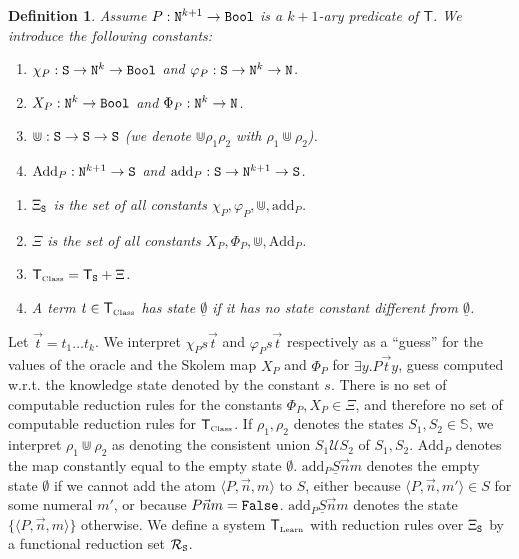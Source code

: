 \documentclass[copyright,creativecommons]{eptcs}
\newcommand{\Nat}                      { {\tt N} }
\newcommand{\Bool}                     { {\tt Bool} }
\newcommand{\State}                    { {\tt S} }
\newcommand{\StateSet}                 {\mathbb{S}}
\newcommand{\SystemT}                  {\mathsf{T}}
\newcommand{\False}                    { {\tt{False}} }
\newcommand{\Class}                    {\mbox{\tiny Class}}
\newcommand{\Learn}                    {\mbox{\tiny Learn}}
\newcommand{\SystemTClass}             {{\SystemT_{\Class}}}
\newcommand{\SystemTLearn}             {{\SystemT_{\Learn}}}
\newcommand{\CupSem}                   { {\mathcal U} }
\newcommand{\Add}                      { {\mbox{Add}} }
\newcommand{\add}                      { {\mbox{add}} }
\newcommand{\makestate}      [1]       { {\underline{#1}} }
\newtheorem{definition}{Definition}
\begin{document}
\begin{definition} \label{definition-TermLanguageL1}
Assume $P:\Nat^{k+1}\rightarrow \Bool$ is a $k+1$-ary predicate of $\SystemT$. We introduce the following constants:
\begin{enumerate}

\item
$\chi_P:\State \rightarrow \Nat^k\rightarrow \Bool$
and
$\varphi_P:\State \rightarrow \Nat^k\rightarrow \Nat$.

\item
$X_P:\Nat^k\rightarrow \Bool$ and $\Phi_P: \Nat^k \rightarrow \Nat$.

\item
$\Cup:\State\rightarrow \State \rightarrow \State$ (we denote $\Cup\rho_1\rho_2$ with $\rho_1\Cup\rho_2$). 

\item
$\Add_P:\Nat^{k+1} \rightarrow \State$ and $\add_P:\State \rightarrow \Nat^{k+1} \rightarrow \State$.

\end{enumerate}
\begin{enumerate}
\item
$\Xi_\State$ is the set of all constants $\chi_P,\varphi_P, \Cup, \add_P$.

\item
$\Xi$ is the set of all constants $X_P,\Phi_P, \Cup, \Add_P$.

\item
$\SystemTClass = \SystemT_\State + \Xi$.

\item
A term $t \in \SystemTClass$ has state $\makestate{\emptyset}$ if it has no state constant different from $\makestate{\emptyset}$.
\end{enumerate}
\end{definition}
Let $\vec{t} = t_1\ldots t_k$. We interpret $\chi_P{s} \vec{t}$ and $\varphi_P{s}\vec{t} $ respectively as a ``guess'' for the values of the oracle and the Skolem map $X_P$ and $\Phi_P$ for $\exists y.P\vec{t}y$, guess computed w.r.t. the knowledge state denoted by the constant $s$.  There is no set of computable reduction rules for the constants $\Phi_P, X_P \in \Xi$, and therefore no set of computable reduction rules for $\SystemTClass$. If $\rho_1, \rho_2$ denotes the states $S_1, S_2 \in \StateSet$, we  interpret $\rho_1 \Cup \rho_2$ as denoting the consistent union $S_1 \CupSem S_2$ of $S_1, S_2$. $\Add_P$ denotes the map constantly equal to the empty state $\emptyset$. $\add_P{\makestate{S}} \vec{n}m $ denotes the empty state $\emptyset$ if we cannot add the atom $\langle P, \vec{n},m\rangle$ to $S$, either because $\langle P,\vec{n},m'\rangle \in S$ for some numeral $m'$, or because $P\vec{n}m={\False}$. $\add_P{\makestate{S}} \vec{n}m $ denotes the state $\{\langle P, \vec{n},m \rangle\}$ otherwise. We define a system $\SystemTLearn$ with reduction rules over $\Xi_\State$ by a functional reduction set $\mathcal{R}_\State$.
\end{document}
